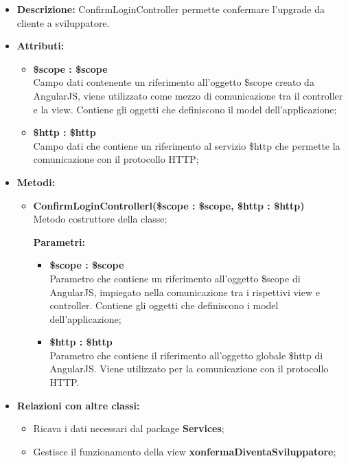 \begin{itemize}
	\item \textbf{Descrizione:} ConfirmLoginController permette confermare l'upgrade da cliente a sviluppatore.
	\item \textbf{Attributi:}
	\begin{itemize}
		
		\item \textbf{\$scope : \$scope}\\
		Campo dati contenente un riferimento all'oggetto \$scope creato da AngularJS, viene utilizzato come mezzo di comunicazione tra il controller e la view. Contiene gli oggetti che definiscono il model dell'applicazione;
		
		\item \textbf{\$http : \$http }\\
		Campo dati che contiene un riferimento al servizio \$http che permette la comunicazione con il protocollo HTTP;
		
	\end{itemize}
	\item \textbf{Metodi:}
	\begin{itemize}
		
		\item \textbf{ConfirmLoginControllerl(\$scope : \$scope, \$http : \$http)}\\
		Metodo costruttore della classe;
		\begin{description}
			\item[\textbf{Parametri:}]
		\end{description}
		\begin{itemize}
			\item \textbf{\$scope : \$scope}\\
			Parametro che contiene un riferimento all'oggetto \$scope di AngularJS, impiegato nella comunicazione tra i rispettivi view e controller. Contiene gli oggetti che definiscono i model dell'applicazione;
			
			\item \textbf{\$http : \$http}\\
			Parametro che contiene il riferimento all'oggetto globale \$http di AngularJS. Viene utilizzato per la comunicazione con il protocollo HTTP.
			
		\end{itemize}		
		
	\end{itemize}
	\item \textbf{Relazioni con altre classi:}
	\begin{itemize}
		\item Ricava i dati necessari dal package \textbf{Services};
		\item Gestisce il funzionamento della view \textbf{xonfermaDiventaSviluppatore};
	\end{itemize}
\end{itemize}

